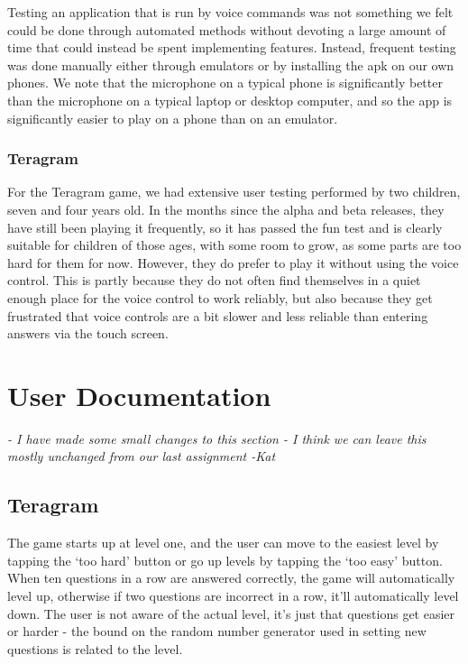 \documentclass[11pt, oneside]{article}
\begin{document}
Testing an application that is run by voice commands was not something
we felt could be done through automated methods without devoting a
large amount of time that could instead be spent implementing
features. Instead, frequent testing was done manually either through
emulators or by installing the apk on our own phones. We note that the
microphone on a typical phone is significantly better than the
microphone on a typical laptop or desktop computer, and so the app is
significantly easier to play on a phone than on an emulator.


\subsubsection*{Teragram}

For the Teragram game, we had extensive user testing performed by two
children, seven and four years old. In the months since the alpha and beta
releases, they have still been playing it frequently, so it has passed
the fun test and is clearly suitable for children of those ages, with
some room to grow, as some parts are too hard for them for
now. However, they do prefer to play it without using the voice
control. This is partly because they do not often find themselves in a
quiet enough place for the voice control to work reliably, but also
because they get frustrated that voice controls are a bit slower and
less reliable than entering answers via the touch screen.

\pagebreak

\section{User Documentation}

{\em - I have made some small changes to this section - I think we can leave this mostly unchanged from our last assignment -Kat}

\subsection{Teragram}

The game starts up at level one, and the user can move to the easiest
level by tapping the `too hard' button or go up levels by tapping the
`too easy' button. When ten questions in a row are answered correctly,
the game will automatically level up, otherwise if two questions are incorrect in a 
row, it'll automatically level down.  The user is not aware of the actual level, it's just that
questions get easier or harder - the bound on the random number
generator used in setting new questions is related to the level.
\end{document}
